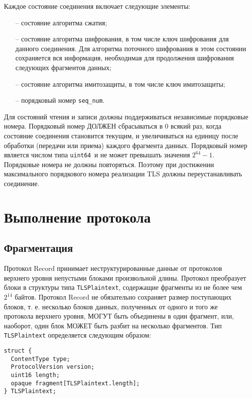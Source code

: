 Каждое состояние соединения включает следующие элементы:
\begin{itemize}
\item[--] 
состояние алгоритма сжатия;

\item[--] 
состояние алгоритма шифрования, в том числе ключ шифрования для данного 
соединения. Для алгоритма поточного шифрования в этом состоянии сохраняется 
вся информация, необходимая для продолжения шифрования следующих фрагментов 
данных; 

\item[--]
состояние алгоритма имитозащиты, в том числе ключ имитозащиты;

\item[--]
порядковый номер \lstinline{seq_num}.
\end{itemize}

Для состояний чтения и записи должны поддерживаться независимые порядковые 
номера. Порядковый номер ДОЛЖЕН сбрасываться в 0 всякий раз, когда 
состояние соединения становится текущим, и увеличиваться на единицу после 
обработки (передачи или приема) каждого фрагмента данных. Порядковый 
номер является числом типа \mbox{\lstinline{uint64}~и} не может превышать 
значения $2^{64}-1$. Порядковые номера не должны повторяться. Поэтому при 
достижении максимального порядкового номера реализации TLS должны 
переустанавливать соединение. 

\section{Выполнение протокола}\label{RECORD.3}

\subsection{Фрагментация}\label{RECORD.3.1}

Протокол Record принимает неструктурированные данные от протоколов 
верхнего уровня непустыми блоками произвольной длины. Протокол 
преобразует блоки в структуры типа \lstinline{TLSPlaintext}, содержащие фрагменты из 
не более чем $2^{14}$ байтов. Протокол Record не обязательно сохраняет размер 
поступающих блоков, т. е. несколько блоков данных, полученных от одного и 
того же протокола верхнего уровня, МОГУТ быть объединены в один фрагмент, 
или, наоборот, один блок МОЖЕТ быть разбит на несколько фрагментов. 
Тип \lstinline{TLSPlaintext} определяется следующим образом:
\begin{lstlisting}
struct {
  ContentType type;
  ProtocolVersion version;
  uint16 length;
  opaque fragment[TLSPlaintext.length];
} TLSPlaintext;
\end{lstlisting}

